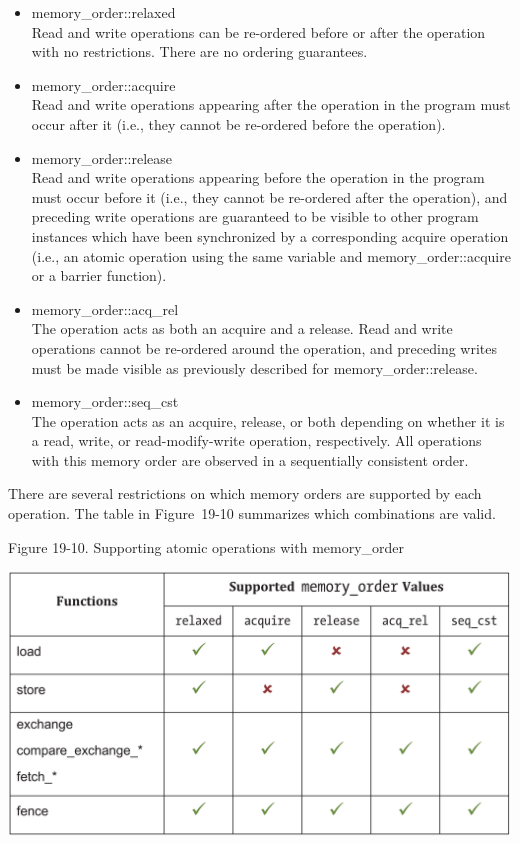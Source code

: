 \begin{itemize}
	\item memory\_order::relaxed \\
	Read and write operations can be re-ordered before or after the operation with no restrictions. There are no ordering guarantees.
	\item memory\_order::acquire \\
	Read and write operations appearing after the operation in the program must occur after it (i.e., they cannot be re-ordered before the operation).
	\item memory\_order::release \\ 
	Read and write operations appearing before the operation in the program must occur before it (i.e., they cannot be re-ordered after the operation), and preceding write operations are guaranteed to be visible to other program instances which have been synchronized by a corresponding acquire operation (i.e., an atomic operation using the same variable and memory\_order::acquire or a barrier function).
	\item memory\_order::acq\_rel \\
	The operation acts as both an acquire and a release. Read and write operations cannot be re-ordered around the operation, and preceding writes must be made visible as previously described for memory\_order::release.
	\item memory\_order::seq\_cst \\
	The operation acts as an acquire, release, or both depending on whether it is a read, write, or read-modify-write operation, respectively. All operations with this memory order are observed in a sequentially consistent order.
\end{itemize}

There are several restrictions on which memory orders are supported by each operation. The table in Figure 19-10 summarizes which combinations are valid.\par

\hspace*{\fill} \par %
Figure 19-10. Supporting atomic operations with memory\_order
\begin{center}
	\includegraphics[width=1.0\textwidth]{content/chapter-19/images/8}
\end{center}

